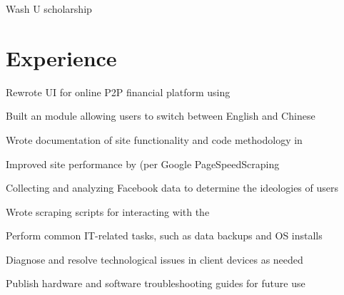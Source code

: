 \documentclass[]{deedy-resume-openfont}
\begin{document}
\begin{minipage}[t]{0.33\textwidth}

\begin{tightemize}
\item Wash U scholarship
\end{tightemize}

\sectionsep

%
%

\end{minipage}
\hfill
\begin{minipage}[t]{0.66\textwidth}


\section{Experience}

\vspace{\topsep} %
\begin{tightemize}
\item Rewrote UI for online P2P financial platform using 
\item Built an  module allowing users to switch between English and Chinese
\item Wrote documentation of site functionality and code methodology in 
\item Improved site performance by  (per Google PageSpeedScraping
\end{tightemize}
\sectionsep

\begin{tightemize}
\item Collecting and analyzing Facebook data to determine the ideologies of users
\item Wrote  scraping scripts for interacting with the 
\end{tightemize}
\sectionsep

\begin{tightemize}
\item Perform common IT-related tasks, such as data backups and OS installs
\item Diagnose and resolve technological issues in client devices as needed
\item Publish hardware and software troubleshooting guides for future use
\end{tightemize}
\sectionsep


\end{minipage}
\end{document}
